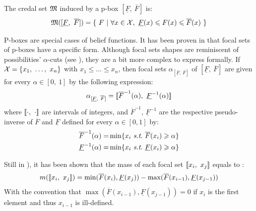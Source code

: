 The credal set $\mathfrak{M}$ induced by a p-box $[\underline{F}, ~\overline{F}]$ is:
\begin{align}
    \mathfrak{M}([\underline{F}, ~\overline{F}]) = \{~ F ~|~ \forall x\in\mathcal{X}, ~\underline{F}(x)\leqslant F(x)\leqslant \overline{F}(x) ~\}
\end{align}

\begin{definition}
    P-boxes are special cases of belief functions. It has been proven in \cite{destercke_unifying_2008} that focal sets of p-boxes have a specific form. Although focal sets shapes are reminiscent of possibilities' $\alpha$-cuts (see ), they are a bit more complex to express formally. If $\mathcal{X}=\{x_1, ~\ldots, ~ x_n\}$ with $x_1\leqslant\ldots\leqslant x_n$, then focal sets $\alpha_{[\underline{F}, ~\overline{F}]}$ of $[\underline{F}, ~\overline{F}]$ are given for every $\alpha\in[0,~1]$ by the following expression:
    \begin{align}
        \alpha_{[\underline{F}, ~\overline{F}]}= [\![ \overline{F}^{-1}(\alpha),~\underline{F}^{-1}(\alpha)]\!]\label{eq:pbox_focal_set}
    \end{align}
    where $[\![\cdot,~\cdot]\!]$ are intervals of integers, and $\overline{F}^{-1}$, $\underline{F}^{-1}$ are the respective pseudo-inverse of $\overline{F}$ and $\underline{F}$ defined for every $\alpha\in[0,1]$ by:
    \begin{align*}
        \overline{F}^{-1}(\alpha) =& \min \{x_i ~\st ~\overline{F}(x_i)\geqslant \alpha\}\\
        \underline{F}^{-1}(\alpha) =& \min \{x_i ~\st ~\underline{F}(x_i)\geqslant \alpha\}
    \end{align*}
    
    Still in \cite{destercke_unifying_2008}), it has been shown that the mass of each focal set $[\![ x_i, ~x_j]\!]$ equals to :
    \begin{align}
        m([\![ x_i, ~x_j]\!]) = \min(\overline{F}(x_i), \underline{F}(x_j)) - \max(\overline{F}(x_{i-1}), \underline{F}(x_{j-1}))
    \end{align}
    With the convention that $\max(\overline{F}(x_{i-1}), \underline{F}(x_{j-1}))=0$ if $x_{i}$ is the first element and thus $x_{i-1}$ is ill-defined. 
\end{definition}

